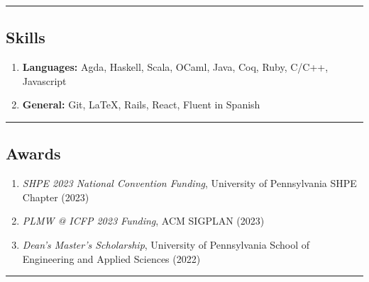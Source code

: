 \documentclass[letterpaper]{article}
\begin{document}
\hrule

\vspace{-0.6em}
\subsection*{Skills}
\begin{enumerate}[label=]
	\parskip=-0.25em

	\item
	\textbf{Languages: } Agda, Haskell, Scala, OCaml, Java, Coq, Ruby, C/C++, Javascript

	\item
	\textbf{General: } Git, \LaTeX, Rails, React, Fluent in Spanish

\end{enumerate}


\hrule
\vspace{-0.6em}
\subsection*{Awards}
\begin{enumerate}[label=]
	\parskip=-0.25em

    \item \emph{SHPE 2023 National Convention Funding}, University of Pennsylvania SHPE Chapter (2023)
    \item \emph{PLMW @ ICFP 2023 Funding}, ACM SIGPLAN  (2023)
    \item \emph{Dean's Master's Scholarship}, University of Pennsylvania School of Engineering and Applied Sciences (2022)

\end{enumerate}

\hrule
\end{document}

